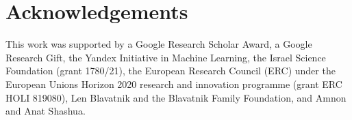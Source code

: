 \section{Acknowledgements}
This work was supported by a Google Research
Scholar Award, a Google Research Gift, the Yandex Initiative in Machine Learning, the Israel Science Foundation (grant 1780/21), the European Research
Council (ERC) under the European Unions Horizon 2020
research and innovation programme (grant ERC HOLI
819080), Len Blavatnik and the Blavatnik Family Foundation, and Amnon
and Anat Shashua.